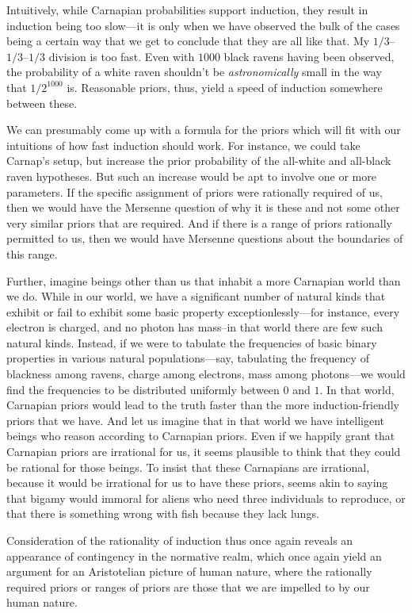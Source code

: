 Intuitively, while Carnapian probabilities support induction, they result in induction being too slow---it is only when we have observed the bulk of the cases
being a certain way that we get to conclude that they are all like that. My $1/3$--$1/3$--$1/3$ division is too fast. Even with
$1000$ black ravens having been observed, the probability of a white raven shouldn't be \textit{astronomically} small in the way
that $1/2^{1000}$ is. Reasonable priors, thus, yield a speed of induction somewhere between these. 

We can presumably come up with a formula for the priors which will fit with our intuitions of how fast induction should work.
For instance, we could take Carnap's setup, but increase the prior probability of the all-white and all-black raven hypotheses. 
But such an increase would be apt to involve one or more parameters. If the specific assignment of priors were rationally
required of us, then we would have the Mersenne question of why it is these and not some other very similar priors that are required.
And if there is a range of priors rationally permitted to us, then we would have Mersenne questions about the boundaries of
this range. 

Further, imagine beings other than us that inhabit a more Carnapian world than we do. While in our world, we have a significant number of natural kinds
that exhibit or fail to exhibit some basic property exceptionlessly---for instance, every electron is charged, and no photon 
has mass--in that world there are few such natural kinds. Instead, if we were to tabulate the frequencies of basic binary properties
in various natural populations---say, tabulating the frequency of blackness among ravens, charge among electrons, mass among photons---we 
would find the frequencies to be distributed uniformly between $0$ and $1$. In that world, Carnapian priors would lead to the truth faster
than the more induction-friendly priors that we have. And let us imagine that in that world we have intelligent beings who reason according
to Carnapian priors. Even if we happily grant that Carnapian priors are irrational for us, it seems plausible to think that they could be
rational for those beings. To insist that these Carnapians are irrational, because it would be irrational for us to have these priors,
seems akin to saying that bigamy would immoral for aliens who need three individuals to reproduce, or that there is something wrong with fish
because they lack lungs. 

Consideration of the rationality of induction thus once again reveals an appearance of contingency in the normative realm, which
once again yield an argument for an Aristotelian picture of human nature, where the rationally required priors or ranges of priors
are those that we are impelled to by our human nature.

